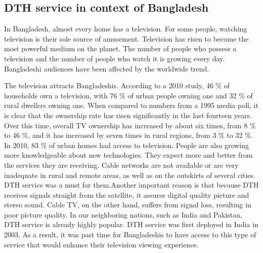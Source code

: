 \begin{spacing}{1.0}
\subsection{DTH service in context of Bangladesh}
In Bangladesh, almost every home has a television. For some people, watching television is their sole source of amusement.
Television has risen to become the most powerful medium on the planet. The number of people who possess a television and the number of people who watch it is growing every day. Bangladeshi audiences have been affected by the worldwide trend.

The television attracts Bangladeshis. According to a 2010 study, 46 \% of households own a television, with 76 \% of urban people owning one and 32 \% of rural dwellers owning one.
When compared to numbers from a 1995 media poll, it is clear that the ownership rate has risen significantly in the last fourteen years. Over this time, overall TV ownership has increased by about six times, from 8 \% to 46 \%, and it has increased by seven times in rural regions, from 3 \% to 32 \%. In 2010, 83 \% of urban homes had access to television. People are also growing more knowledgeable about new technologies. They expect more and better from the services they are receiving. Cable networks are not available or are very inadequate in rural and remote areas, as well as on the outskirts of several cities. DTH service was a must for them.Another important reason is that because DTH receives signals straight from the satellite, it assures digital quality picture and stereo sound. Cable TV, on the other hand, suffers from signal loss, resulting in poor picture quality. In our neighboring nations, such as India and Pakistan, DTH service is already highly popular. DTH service was first deployed in India in 2003. As a result, it was past time for Bangladeshis to have access to this type of service that would enhance their television viewing experience.

\end{spacing}
